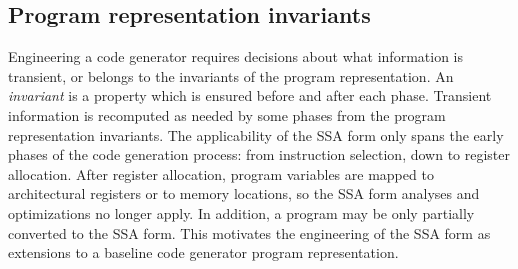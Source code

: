 %
%
%
%
%
%

%
%

\subsection{Program representation invariants}


Engineering a code generator requires decisions about what information is
transient, or belongs to the invariants of the program representation.  An
\emph{invariant} is a property which is ensured before and after each phase.
Transient information is recomputed as needed by some phases from the program
representation invariants.  The applicability of the SSA form only spans the
early phases of the code generation process: from instruction selection, down to
register allocation.  After register allocation, program variables are mapped to
architectural registers or to memory locations, so the SSA form analyses and
optimizations no longer apply. In addition, a program may be only partially
converted to the SSA form. This motivates the engineering of the SSA form
as extensions to a baseline code generator program representation.

